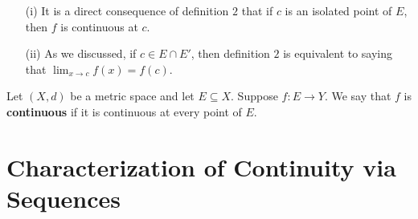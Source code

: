 \documentclass[a4paper]{article}
\begin{document}
\begin{remark}
    \begin{enumerate}
        \item[(i)] It is a direct consequence of definition \( 2  \) that if \( c  \) is an isolated point of \( E  \), then \( f  \) is continuous at \( c  \).
        \item[(ii)] As we discussed, if \( c \in E \cap E' \), then definition \( 2 \) is equivalent to saying that \( \lim_{ x \to c } f(x) = f(c) \).
    \end{enumerate}
\end{remark}

\begin{definition}
   Let \( (X,d)\) be a metric space and let \( E \subseteq X  \). Suppose \( f: E \to Y \). We say that \( f  \) is \textbf{continuous} if it is continuous at every point of \( E  \).
\end{definition}

\section{Characterization of Continuity via Sequences}\label{Characterization of Continuity via Sequences}
\end{document}

